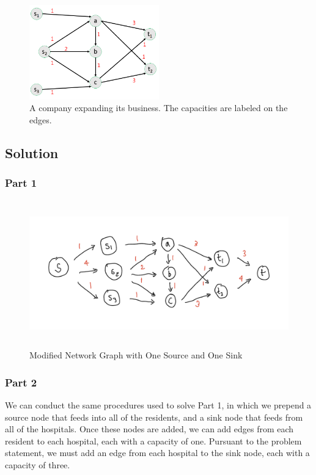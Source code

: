 \documentclass[12pt,letterpaper]{article}
\begin{document}
\begin{figure}[h!]
    \centering
    \includegraphics[width=0.5\textwidth]{flow3.png}
    \caption{A company expanding its business. The capacities are labeled on the edges.}
    \label{flow3}
\end{figure}

\newpage
\subsection*{Solution}

\subsubsection*{Part 1}

\begin{figure}[!htb]
    \centering
    \includegraphics[height=2.5in]{q3-1.jpeg}
    \caption{Modified Network Graph with One Source and One Sink}
    \label{q3-1}
\end{figure}

\subsubsection*{Part 2}

We can conduct the same procedures used to solve Part 1, in which we prepend a source node that feeds into all of the residents, and a sink node that feeds from all of the hospitals. Once these nodes are added, we can add edges from each resident to each hospital, each with a capacity of one. Pursuant to the problem statement, we must add an edge from each hospital to the sink node, each with a capacity of three.
\end{document}
